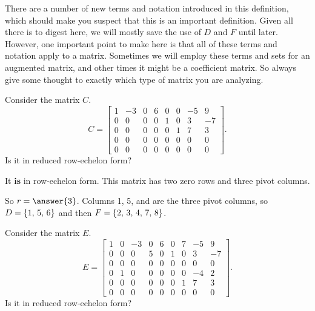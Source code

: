 \documentclass{ximera}
\begin{document}
There are a number of new terms and notation introduced in this
definition, which should make you suspect that this is an important
definition.  Given all there is to digest here, we will mostly save
the use of $D$ and $F$ until later.
However, one important point to make here is that all of these terms
and notation apply to a matrix.  Sometimes we will employ these terms
and sets for an augmented matrix, and other times it might be a
coefficient matrix.  So always give some thought to exactly which type
of matrix you are analyzing.

\begin{example}
  Consider the matrix $C$.
  \[
    C=
    \begin{bmatrix}
      1&-3&0&6&0&0&-5&9\\
      0&0&0&0&1&0&3&-7\\
      0&0&0&0&0&1&7&3\\
      0&0&0&0&0&0&0&0\\
      0&0&0&0&0&0&0&0
    \end{bmatrix}.
  \]
  Is it in reduced row-echelon form?
  \begin{multipleChoice}
  \end{multipleChoice}
  
  \begin{feedback}
    It \textbf{is} in row-echelon form.  This matrix has two zero rows and three pivot columns.
  \end{feedback}
  
  So $r=\answer{3}$.  Columns 1, 5, and  are the three pivot columns, so $D=\left\{1,\,5,\,6\right\}$ and then $F=\left\{2,\,3,\,4,\,7,\,8\right\}$.
\end{example}

\begin{example}
  Consider the matrix $E$.
  \[
    E=
    \begin{bmatrix}
      1&0&-3&0&6&0&7&-5&9\\
      0&0&0&5&0&1&0&3&-7\\
      0&0&0&0&0&0&0&0&0\\
      0&1&0&0&0&0&0&-4&2\\
      0&0&0&0&0&0&1&7&3\\
      0&0&0&0&0&0&0&0&0
    \end{bmatrix}.
  \]
  Is it in reduced row-echelon form?
  \begin{multipleChoice}
  \end{multipleChoice}
\end{example}
\end{document}
